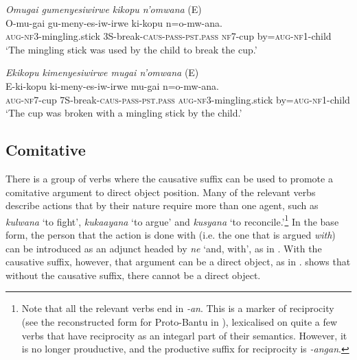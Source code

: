 \documentclass[output=paper,colorlinks,citecolor=brown,draftmode]{langscibook}
\begin{document}
\ea
\begin{xlist}   \label{ex:Saebo:obj-prop2}
\ex \emph{Omugai  gumenyesiwirwe kikopu n'omwana } (E)\\
  \gll O-mu-gai  gu-meny-es-iw-irwe ki-kopu n=o-mw-ana. \\ 
\textsc{aug-nf3-}mingling.stick 3S-break-\textsc{caus-pass-pst.pass} \textsc{nf7}-cup by=\textsc{aug-nf1-}child\\
    \glt  `The mingling stick was used by the child to break the cup.' 
    
      \ex \emph{Ekikopu  kimenyesiwirwe mugai n'omwana} (E)\\
  \gll  E-ki-kopu  ki-meny-es-iw-irwe mu-gai n=o-mw-ana. \\ 
\textsc{aug-nf7}-cup 7S-break-\textsc{caus-pass-pst.pass} \textsc{aug-nf3-}mingling.stick by=\textsc{aug-nf1-}child\\
    \glt  `The cup was broken with a mingling stick by the child.' 
    
      \end{xlist}     
      \z
      
\subsection{Comitative} \label{sec:Saebo:comitatve}

There is a group of verbs where the causative suffix can be used to promote a comitative argument to direct object position. Many of the relevant verbs describe actions that by their nature require more than one agent, such as \emph{kulwana} `to fight', \emph{kukaayana} `to argue'  and \emph{kusyana} `to reconcile.'\footnote{Note that all the relevant verbs end in \emph{-an}. This is a marker of reciprocity (see the reconstructed form for Proto-Bantu in ), lexicalised on quite a few verbs that have reciprocity as an integarl part of their semantics. However, it is no longer prouductive, and the productive suffix for reciprocity is \emph{-angan}.} In the base form, the person that the action is done with (i.e. the one that is argued \emph{with}) can be introduced as an adjunct headed by \emph{ne} `and, with', as in . With the causative suffix, however, that argument can be a direct object, as in .  shows that without the causative suffix, there cannot be a direct object.  
\end{document}
